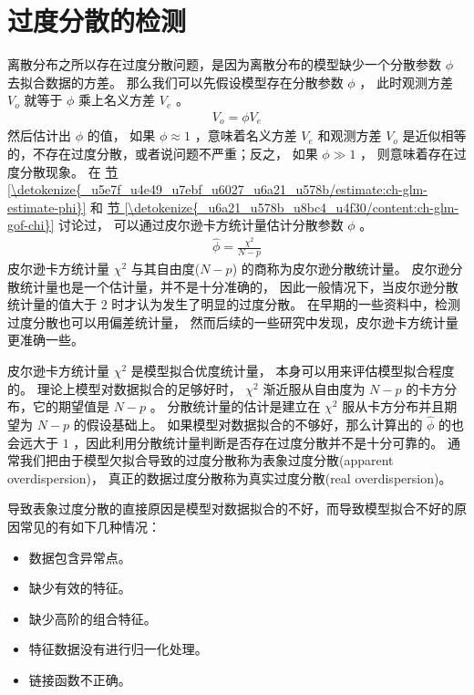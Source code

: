 \documentclass[letterpaper,10pt,english]{sphinxmanual}
\begin{document}
\section{过度分散的检测}
\label{\detokenize{_u8fc7_u5ea6_u5206_u6563/content:id3}}
离散分布之所以存在过度分散问题，是因为离散分布的模型缺少一个分散参数 \(\phi\)
去拟合数据的方差。
那么我们可以先假设模型存在分散参数 \(\phi\) ，
此时观测方差 \(V_o\) 就等于 \(\phi\) 乘上名义方差 \(V_e\)
。
\begin{equation}\label{equation:过度分散/content:过度分散/content:3}
\begin{split}V_o = \phi V_e\end{split}
\end{equation}
然后估计出 \(\phi\) 的值，
如果 \(\phi \approx 1\) ，意味着名义方差 \(V_e\) 和观测方差 \(V_o\)
是近似相等的，不存在过度分散，或者说问题不严重；反之，
如果 \(\phi \gg 1\) ，
则意味着存在过度分散现象。
在 \hyperref[\detokenize{_u5e7f_u4e49_u7ebf_u6027_u6a21_u578b/estimate:ch-glm-estimate-phi}]{节 \ref{\detokenize{_u5e7f_u4e49_u7ebf_u6027_u6a21_u578b/estimate:ch-glm-estimate-phi}}} 和 \hyperref[\detokenize{_u6a21_u578b_u8bc4_u4f30/content:ch-glm-gof-chi}]{节 \ref{\detokenize{_u6a21_u578b_u8bc4_u4f30/content:ch-glm-gof-chi}}} 讨论过，
可以通过皮尔逊卡方统计量估计分散参数 \(\phi\)
。
\begin{equation}\label{equation:过度分散/content:过度分散/content:4}
\begin{split}\hat{\phi}=\frac{\chi^2}{N-p}\end{split}
\end{equation}
皮尔逊卡方统计量 \(\chi^2\) 与其自由度(\(N-p\))
的商称为皮尔逊分散统计量。
皮尔逊分散统计量也是一个估计量，并不是十分准确的，
因此一般情况下，当皮尔逊分散统计量的值大于 \(2\)
时才认为发生了明显的过度分散。
在早期的一些资料中，检测过度分散也可以用偏差统计量，
然而后续的一些研究中发现，皮尔逊卡方统计量更准确一些。

皮尔逊卡方统计量 \(\chi^2\) 是模型拟合优度统计量，
本身可以用来评估模型拟合程度的。
理论上模型对数据拟合的足够好时， \(\chi^2\) 渐近服从自由度为 \(N-p\)
的卡方分布，它的期望值是 \(N-p\) 。
分散统计量的估计是建立在 \(\chi^2\) 服从卡方分布并且期望为 \(N-p\) 的假设基础上。
如果模型对数据拟合的不够好，那么计算出的 \(\hat{\phi}\) 的也会远大于 \(1\)
，因此利用分散统计量判断是否存在过度分散并不是十分可靠的。
通常我们把由于模型欠拟合导致的过度分散称为表象过度分散(apparent overdispersion)，
真正的数据过度分散称为真实过度分散(real overdispersion)。

导致表象过度分散的直接原因是模型对数据拟合的不好，而导致模型拟合不好的原因常见的有如下几种情况：
\begin{itemize}
\item {} 
数据包含异常点。

\item {} 
缺少有效的特征。

\item {} 
缺少高阶的组合特征。

\item {} 
特征数据没有进行归一化处理。

\item {} 
链接函数不正确。

\end{itemize}
\end{document}
